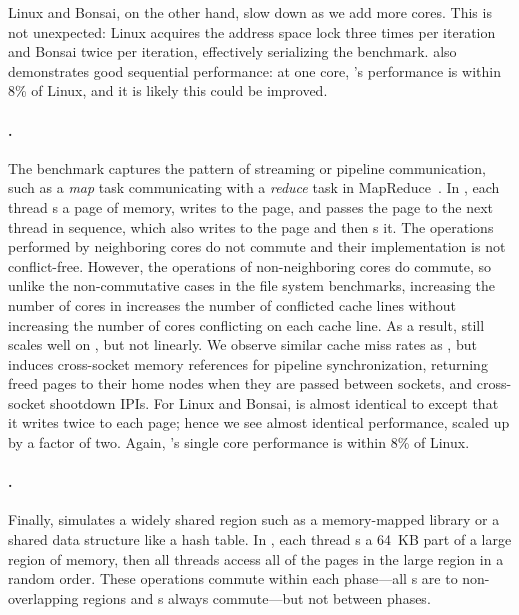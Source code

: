 Linux and Bonsai, on the other hand, slow down as we add more cores.
%
This is not unexpected: Linux acquires the address space lock three
times per iteration and Bonsai twice per iteration, effectively
serializing the benchmark.
%
\sys also demonstrates good sequential performance: at one core,
\sys's performance is within 8\% of Linux, and it is likely this could
be improved.

\paragraph{.} The  benchmark captures
the pattern of streaming or pipeline communication, such as a
\emph{map} task communicating with a \emph{reduce} task in
MapReduce~\cite{dean:mapreduce}.
%
In , each thread s a page of memory, writes to
the page, and passes the page to the next thread in sequence, which
also writes to the page and then s it.
%
The operations performed by neighboring cores do not commute and their
implementation is not conflict-free.
%
However, the operations of non-neighboring cores do commute, so unlike
the non-commutative cases in the file system benchmarks, increasing
the number of cores in  increases the number of conflicted
cache lines without increasing the number of cores conflicting on each
cache line.
%
As a result,  still scales well on \sys, but not linearly.
%
We observe similar cache miss rates as , but  induces
cross-socket memory references for pipeline synchronization, returning
freed pages to their home nodes when they are passed between sockets,
and cross-socket shootdown IPIs.
For Linux and Bonsai,  is almost identical to  except
that it writes twice to each page; hence we see almost identical
performance, scaled up by a factor of two.
%
Again, \sys's single core performance is within 8\% of Linux.


\paragraph{.} Finally,  simulates a widely shared
region such as a memory-mapped library or a shared data structure like
a hash table.
%
In , each thread s a 64~KB part of a large region
of memory, then all threads access all of the pages in the large
region in a random order.
%
These operations commute within each phase---all s are to
non-overlapping regions and s always commute---but not
between phases.

